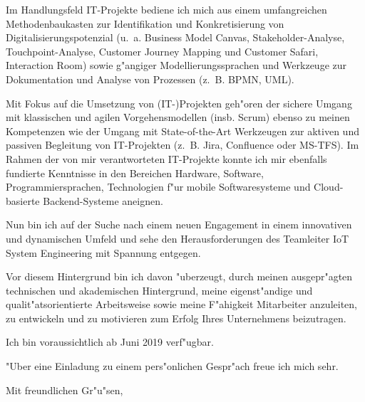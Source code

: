 \documentclass[10pt,a4paper]{dinbrief}
\begin{document}
\begin{letter}
Im Handlungsfeld IT-Projekte bediene ich mich aus einem umfangreichen Methodenbaukasten zur Identifikation und Konkretisierung von Digitalisierungspotenzial (u.~a. Business Model Canvas, Stakeholder-Analyse, Touchpoint-Analyse, Customer Journey Mapping und Customer Safari, Interaction Room) sowie g"angiger Modellierungssprachen und Werkzeuge zur Dokumentation und Analyse von Prozessen (z.~B. BPMN, UML).

Mit Fokus auf die Umsetzung von (IT-)Projekten geh"oren der sichere Umgang mit klassischen und agilen Vorgehensmodellen (insb. Scrum) ebenso zu meinen Kompetenzen wie der Umgang mit State-of-the-Art Werkzeugen zur aktiven und passiven Begleitung von IT-Projekten (z.~B. Jira, Confluence oder MS-TFS). Im Rahmen der von mir verantworteten IT-Projekte konnte ich mir ebenfalls fundierte Kenntnisse in den Bereichen Hardware, Software, Programmiersprachen, Technologien f"ur mobile Softwaresysteme und Cloud-basierte Backend-Systeme aneignen.

Nun bin ich auf der Suche nach einem neuen Engagement in einem innovativen und dynamischen Umfeld und sehe den Herausforderungen des Teamleiter IoT System Engineering mit Spannung entgegen.

Vor diesem Hintergrund bin ich davon "uberzeugt, durch meinen ausgepr"agten technischen und akademischen Hintergrund, meine eigenst"andige und qualit"atsorientierte Arbeitsweise sowie meine F"ahigkeit Mitarbeiter anzuleiten, zu entwickeln und zu motivieren zum Erfolg Ihres Unternehmens beizutragen.

Ich bin voraussichtlich ab Juni 2019 verf"ugbar. %

"Uber eine Einladung zu einem pers"onlichen Gespr"ach freue ich mich sehr.

\closing{Mit freundlichen Gr"u"sen,}
\end{letter}
\end{document}
